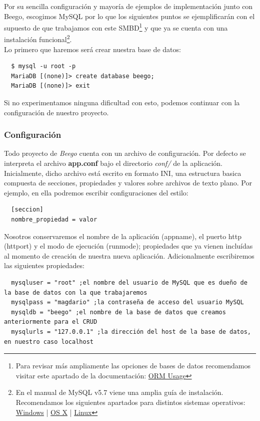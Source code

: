 \documentclass[12pt]{article}
\begin{document}
Por su sencilla configuración y mayoría de ejemplos de implementación junto con
Beego, escogimos MySQL por lo que los siguientes puntos se ejemplificarán
con el supuesto de que trabajamos con este SMBD\footnote{Para revisar más ampliamente
  las opciones de bases de datos recomendamos visitar este apartado de la documentación:
  \href{http://beego.me/docs/mvc/model/orm.md#set-up-database}{ORM Usage}} y que ya se cuenta con una instalación
funcional\footnote{En el manual de MySQL v5.7 viene una amplia guía de instalación.
  Recomendamos los siguientes apartados para distintos sistemas operativos:
  \href{http://dev.mysql.com/doc/refman/5.7/en/windows-installation.html}{Windows} |
  \href{http://dev.mysql.com/doc/refman/5.7/en/osx-installation.html}{OS X} |
  \href{http://dev.mysql.com/doc/refman/5.7/en/linux-installation.html}{Linux}}.\\[2mm]
Lo primero que haremos será crear nuestra base de datos:
\begin{verbatim}
  $ mysql -u root -p
  MariaDB [(none)]> create database beego;
  MariaDB [(none)]> exit
\end{verbatim}
Si no experimentamos ninguna dificultad con esto, podemos continuar con la
configuración de nuestro proyecto.
\subsubsection*{Configuración}
Todo proyecto de \textit{Beego} cuenta con un archivo de configuración.
Por defecto se interpreta el archivo \textbf{app.conf} bajo el directorio
\textit{conf/} de la aplicación. Inicialmente, dicho archivo está escrito en formato INI,
una estructura basica compuesta de
secciones, propiedades y valores sobre archivos de texto plano. Por ejemplo, en ella podremos escribir
configuraciones del estilo:
\begin{verbatim}
  [seccion]
  nombre_propiedad = valor
\end{verbatim}
Nosotros conservaremos el nombre de la aplicación (appname), el puerto http
(httport) y el modo de ejecución (runmode); propiedades que ya vienen incluídas
al momento de creación de nuestra nueva aplicación. Adicionalmente
escribiremos las siguientes propiedades:
\begin{verbatim}
  mysqluser = "root" ;el nombre del usuario de MySQL que es dueño de la base de datos con la que trabajaremos
  mysqlpass = "magdario" ;la contraseña de acceso del usuario MySQL
  mysqldb = "beego" ;el nombre de la base de datos que creamos anteriormente para el CRUD
  mysqlurls = "127.0.0.1" ;la dirección del host de la base de datos, en nuestro caso localhost
\end{verbatim}
\end{document}
